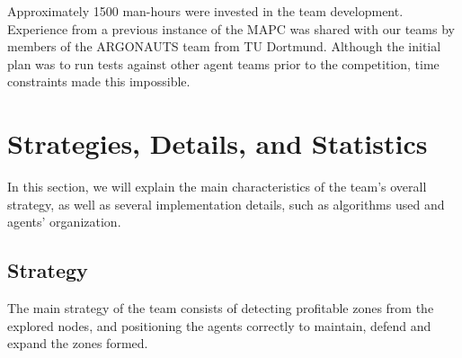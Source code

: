 \documentclass{llncs2e/llncs}
\begin{document}
    Approximately 1500 man-hours were invested in the team development.
    Experience from a previous instance of the MAPC was shared with our teams by
    members of the ARGONAUTS team from TU Dortmund\cite{Holzgen:2011}. Although
    the initial plan was to run tests against other agent teams prior to the
    competition, time constraints made this impossible.



\section{Strategies, Details, and Statistics}

    
    In this section, we will explain the main characteristics of the team's 
    overall strategy, as well as several implementation details, such as 
    algorithms used and agents' organization.

\subsection{Strategy}

    The main strategy of the team consists of detecting profitable zones from the 
    explored nodes, and positioning the agents correctly to maintain, defend 
    and expand the zones formed. 
    
\end{document}
